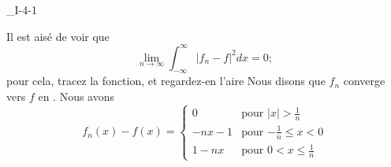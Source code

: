 

\begin{corrige}{_I-4-1}

Il est aisé de voir que
\begin{equation}
	\lim_{n\to\infty}\int_{-\infty}^{\infty}| f_n-f |^2dx=0;
\end{equation}
pour cela, tracez la fonction, et regardez-en l'aire 
Nous disons que $f_n$ converge vers $f$ en . Nous avons
\begin{equation}
	f_n(x)-f(x)=
\begin{cases}
	0	&	\text{pour $| x |>\frac{1}{ n }$}\\
	-nx-1	&	 \text{pour $-\frac{ 1 }{ n }\leq x<0$}\\
	1-nx	&	 \text{pour $0<x\leq\frac{1}{ n }$}
\end{cases}
\end{equation}
%

\end{corrige}
